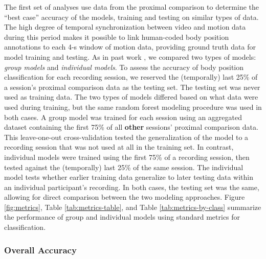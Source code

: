 \documentclass[
  man]{apa6}
\begin{document}
The first set of analyses use data from the proximal comparison to determine the ``best case'' accuracy of the models, training and testing on similar types of data. The high degree of temporal synchronization between video and motion data during this period makes it possible to link human-coded body position annotations to each 4-s window of motion data, providing ground truth data for model training and testing. As in past work \autocite{FranchakScott2021}, we compared two types of models: \emph{group models} and \emph{individual models}. To assess the accuracy of body position classification for each recording session, we reserved the (temporally) last 25\% of a session's proximal comparison data as the testing set. The testing set was never used as training data. The two types of models differed based on what data were used during training, but the same random forest modeling procedure was used in both cases. A group model was trained for each session using an aggregated dataset containing the first 75\% of all \textbf{other} sessions' proximal comparison data. This leave-one-out cross-validation tested the generalization of the model to a recording session that was not used at all in the training set. In contrast, individual models were trained using the first 75\% of a recording session, then tested against the (temporally) last 25\% of the same session. The individual model tests whether earlier training data generalize to later testing data within an individual participant's recording. In both cases, the testing set was the same, allowing for direct comparison between the two modeling approaches. Figure \ref{fig:metrics}, Table \ref{tab:metrics-table}, and Table \ref{tab:metrics-by-class} summarize the performance of group and individual models using standard metrics for classification.

\hypertarget{overall-accuracy}{%
\subsubsection{Overall Accuracy}\label{overall-accuracy}}
\end{document}
